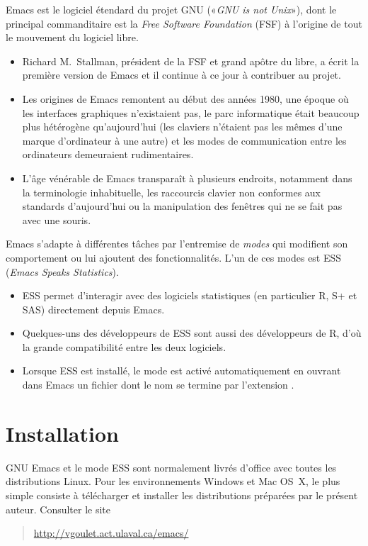 Emacs est le logiciel étendard du projet GNU («\emph{GNU is not
  Unix}»), dont le principal commanditaire est la \emph{Free Software
  Foundation} (FSF) à l'origine de tout le mouvement du logiciel
libre.
\begin{itemize}
\item Richard M.\ Stallman, président de la FSF et grand apôtre du
  libre, a écrit la première version de Emacs et il continue à ce jour
  à contribuer au projet.
\item Les origines de Emacs remontent au début des années 1980, une
  époque où les interfaces graphiques n'existaient pas, le parc
  informatique était beaucoup plus hétérogène qu'aujourd'hui (les
  claviers n'étaient pas les mêmes d'une marque d'ordinateur à une
  autre) et les modes de communication entre les ordinateurs
  demeuraient rudimentaires.
\item L'âge vénérable de Emacs transparaît à plusieurs endroits,
  notamment dans la terminologie inhabituelle, les raccourcis clavier
  non conformes aux standards d'aujourd'hui ou la manipulation des
  fenêtres qui ne se fait pas avec une souris.
\end{itemize}

Emacs s'adapte à différentes tâches par l'entremise de \emph{modes}
qui modifient son comportement ou lui ajoutent des fonctionnalités.
L'un de ces modes est ESS (\emph{Emacs Speaks Statistics}).
\begin{itemize}
\item ESS permet d'interagir avec des logiciels statistiques (en
  particulier R, S+ et SAS) directement depuis Emacs.
\item Quelques-uns des développeurs de ESS sont aussi des développeurs
  de R, d'où la grande compatibilité entre les deux logiciels.
\item Lorsque ESS est installé, le mode est activé automatiquement en
  ouvrant dans Emacs un fichier dont le nom se termine par l'extension
  .
\end{itemize}


\section{Installation}
\label{emacs+ess:installation}

GNU Emacs et le mode ESS sont normalement livrés d'office avec toutes
les distributions Linux. Pour les environnements Windows et Mac OS~X,
le plus simple consiste à télécharger et installer les distributions
préparées par le présent auteur. Consulter le site
\begin{quote}
  \url{http://vgoulet.act.ulaval.ca/emacs/}
\end{quote}


